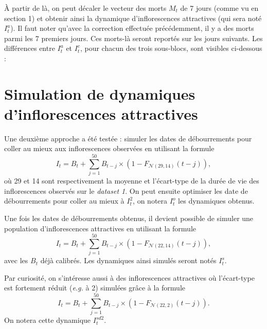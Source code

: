 \documentclass[a4paper, 11pt]{article}
\begin{document}
À partir de là, on peut décaler le vecteur des morts $M_t$ de 7 jours (comme vu en section 1) et obtenir ainsi la dynamique d'inflorescences attractives (qui sera noté $I_t^a$). Il faut noter qu'avec la correction effectuée précédemment, il y a des morts parmi les 7 premiers jours. Ces morts-là seront reportés sur les jours suivants.
Les différences entre $I_t^a$ et $I_t^c$, pour chacun des trois sous-blocs, sont visibles ci-dessous :

\begin{figure}[h]
 \centering
\end{figure}
 
\begin{figure}[h]
 \centering
\end{figure}

\begin{figure}[h]
 \centering
\end{figure}


\section{Simulation de dynamiques d'inflorescences attractives}

Une deuxième approche a été testée : simuler les dates de débourrements pour coller au mieux aux inflorescences observées en utilisant la formule
$$I_t = B_t + \sum_{j = 1}^{50} B_{t-j}\times \left( 1 - F_{\mathcal{N}\left( 29, 14 \right)}(t-j) \right),$$
où 29 et 14 sont respectivement la moyenne et l’écart-type de la durée de vie des inflorescences observés sur le \textit{dataset 1}. On peut ensuite optimiser les date de débourrements pour coller au mieux à $I_t^2$, on notera $I_t^o$ les dynamiques obtenus.

Une fois les dates de débourrements obtenus, il devient possible de simuler une population d’inflorescences
attractives en utilisant la formule
$$I_t = B_t + \sum_{j = 1}^{50} B_{t-j}\times \left( 1 - F_{\mathcal{N}\left( 22, 14 \right)}(t-j) \right),$$
avec les $B_t$ déjà calibrés. Les dynamiques ainsi simulés seront notés $I_t^s$.

Par curiosité, on s'intéresse aussi à des inflorescences attractives où l'écart-type est fortement réduit (\textit{e.g.} à 2) simulées grâce à la formule
$$I_t = B_t + \sum_{j = 1}^{50} B_{t-j}\times \left( 1 - F_{\mathcal{N}\left( 22, 2 \right)}(t-j) \right).$$
On notera cette dynamique $I_t^{sd2}$.
\end{document}

